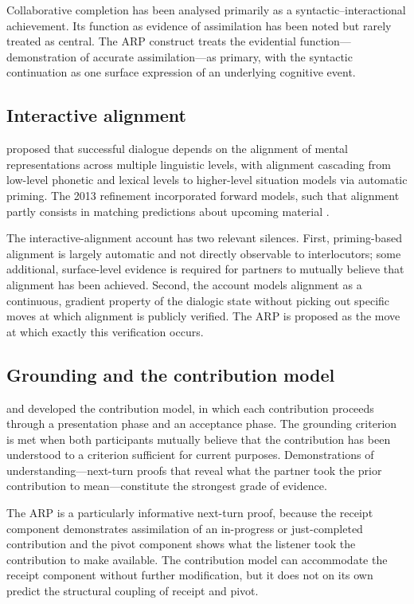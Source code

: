 Collaborative completion has been analysed primarily as a syntactic--interactional achievement. Its function as evidence of assimilation has been noted but rarely treated as central. The ARP construct treats the evidential function---demonstration of accurate assimilation---as primary, with the syntactic continuation as one surface expression of an underlying cognitive event.

\subsection{Interactive alignment}

\citet{PickeringGarrod2004} proposed that successful dialogue depends on the alignment of mental representations across multiple linguistic levels, with alignment cascading from low-level phonetic and lexical levels to higher-level situation models via automatic priming. The 2013 refinement incorporated forward models, such that alignment partly consists in matching predictions about upcoming material \citep{PickeringGarrod2013}.

The interactive-alignment account has two relevant silences. First, priming-based alignment is largely automatic and not directly observable to interlocutors; some additional, surface-level evidence is required for partners to mutually believe that alignment has been achieved. Second, the account models alignment as a continuous, gradient property of the dialogic state without picking out specific moves at which alignment is publicly verified. The ARP is proposed as the move at which exactly this verification occurs.

\subsection{Grounding and the contribution model}

\citet{ClarkSchaefer1989} and \citet{ClarkBrennan1991} developed the contribution model, in which each contribution proceeds through a presentation phase and an acceptance phase. The grounding criterion is met when both participants mutually believe that the contribution has been understood to a criterion sufficient for current purposes. Demonstrations of understanding---next-turn proofs that reveal what the partner took the prior contribution to mean---constitute the strongest grade of evidence.

The ARP is a particularly informative next-turn proof, because the receipt component demonstrates assimilation of an in-progress or just-completed contribution and the pivot component shows what the listener took the contribution to make available. The contribution model can accommodate the receipt component without further modification, but it does not on its own predict the structural coupling of receipt and pivot.

